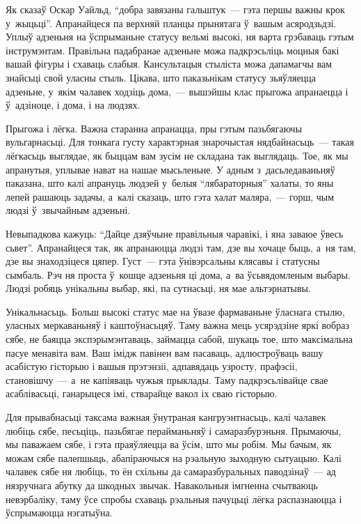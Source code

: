 Як сказаў Оскар Уайльд, ``добра завязаны гальштук~--- гэта першы важны крок у~жыцьці''. Апранайцеся па верхняй планцы прынятага ў~вашым асяродзьдзі. Уплыў адзеньня на ўспрыманьне статусу вельмі высокі, ня варта грэбаваць гэтым інструмэнтам. Правільна падабранае адзеньне можа падкрэсьліць моцныя бакі вашай фігуры і схаваць слабыя. Кансультацыя стыліста можа дапамагчы вам знайсьці свой уласны стыль. Цікава, што паказьнікам статусу зьяўляецца адзеньне, у~якім чалавек ходзіць дома,~--- вышэйшы клас прыгожа апранаецца і ў~адзіноце, і дома, і на людзях.

Прыгожа і лёгка. Важна старанна апранацца, пры гэтым пазьбягаючы вульгарнасьці. Для тонкага густу характэрная знарочыстая нядбайнасьць~--- такая лёгкасьць выглядае, як быццам вам зусім не складана так выглядаць. Тое, як мы апранутыя, уплывае нават на нашае мысьленьне. У адным з~дасьледаваньняў паказана, што калі апрануць людзей у~белыя ``лябараторныя'' халаты, то яны лепей рашаюць задачы, а~калі сказаць, што гэта халат маляра,~--- горш, чым людзі ў~звычайным адзеньні.

Невыпадкова кажуць: ``Дайце дзяўчыне правільныя чаравікі, і яна заваюе ўвесь сьвет''. Апранайцеся так, як апранаюцца людзі там, дзе вы хочаце быць, а~ня там, дзе вы знаходзіцеся цяпер. Густ~--- гэта ўнівэрсальны клясавы і статусны сымбаль. Рэч ня проста ў~кошце адзеньня ці дома, а~ва ўсьвядомленым выбары. Людзі робяць унікальны выбар, які, па сутнасьці, ня мае альтэрнатывы.

Унікальнасьць. Больш высокі статус мае на ўвазе фармаваньне ўласнага стылю, уласных меркаваньняў і каштоўнасьцяў. Таму важна мець усярэдзіне яркі вобраз сябе, не баяцца экспэрымэнтаваць, займацца сабой, шукаць тое, што максімальна пасуе менавіта вам. Ваш імідж павінен вам пасаваць, адлюстроўваць вашу асабістую гісторыю і вашыя прэтэнзіі, адпавядаць узросту, прафэсіі, становішчу~--- а~не капіяваць чужыя прыклады. Таму падкрэсьлівайце свае асаблівасьці, ганарыцеся імі, стварайце вакол іх сваю гісторыю.

Для прывабнасьці таксама важная ўнутраная кангруэнтнасьць, калі чалавек любіць сябе, песьціць, пазьбягае перайманьняў і самаразбурэньня. Прымаючы, мы паважаем сябе, і гэта праяўляецца ва ўсім, што мы робім. Мы бачым, як можам сябе палепшыць, абапіраючыся на рэальную зыходную сытуацыю. Калі чалавек сябе ня любіць, то ён схільны да самаразбуральных паводзінаў~--- ад нязручнага абутку да шкодных звычак. Навакольныя імгненна счытваюць невэрбаліку, таму ўсе спробы схаваць рэальныя пачуцьці лёгка распазнаюцца і ўспрымаюцца нэгатыўна.

